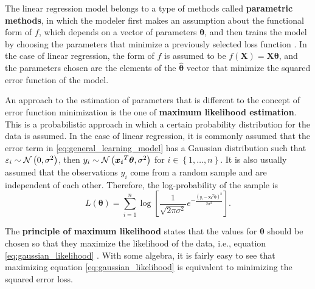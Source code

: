 The linear regression model belongs to a type of methods called \textbf{parametric methods}, in which the modeler first makes an assumption about the functional form of $f$, which depends on a vector of parameters $\boldsymbol{\theta}$, and then trains the model by choosing the parameters that minimize a previously selected loss function \cite[p.~21]{james2013introduction}. In the case of linear regression, the form of $f$ is assumed to be $f(\boldsymbol{X}) = \boldsymbol{X}\boldsymbol{\theta}$, and the parameters chosen are the elements of the $\hat{\boldsymbol{\theta}}$ vector that minimize the squared error function of the model.

An approach to the estimation of parameters that is different to the concept of error function minimization is the one of \textbf{maximum likelihood estimation}.
This is a probabilistic approach in which a certain probability distribution for the data is assumed.
In the case of linear regression, it is commonly assumed that the error term in \eqref{eq:general_learning_model} has a Gaussian distribution such that $\varepsilon_i \sim \mathcal{N}\left( 0, \sigma^2 \right)$, then $y_i \sim \mathcal{N}\left( \boldsymbol{x_i}^T \boldsymbol{\theta}, \sigma^2 \right)$ for $i \in \left\{ 1, \ldots, n \right\}$. It is also usually assumed that the observations $y_i$ come from a random sample and are independent of each other. Therefore, the log-probability of the sample is
\begin{equation}
  \label{eq:gaussian_likelihood}
  L(\boldsymbol{\theta}) = \sum_{i = 1}^n \log \left[ \frac{1}{\sqrt{2 \pi \sigma^2}} e^{- \frac{(y_i - \boldsymbol{x_i}^T \boldsymbol{\theta})^2}{2\sigma^2}} \right].
\end{equation}

The \textbf{principle of maximum likelihood} states that the values for $\boldsymbol{\theta}$ should be chosen so that they maximize the likelihood of the data, i.e., equation \eqref{eq:gaussian_likelihood} \cite[p.~31]{friedman2001elements} \cite[p.~303]{roussas1973first}.
With some algebra, it is fairly easy to see that maximizing equation \eqref{eq:gaussian_likelihood} is equivalent to minimizing the squared error loss.

